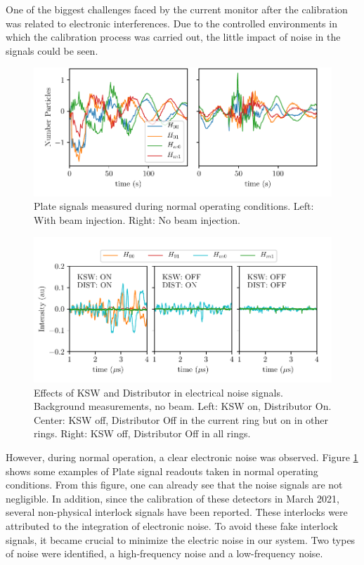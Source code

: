 One of the biggest challenges faced by the \hzhm current monitor after the calibration was related to electronic interferences. Due to the controlled environments in which the calibration process was carried out, the little impact of noise in the signals could be seen.

\begin{figure}[]
    \centering
    \includegraphics[width=1.0\columnwidth]{Figure_NoiseProblems/NoiseProblem.pdf}
    \caption{Plate signals measured during normal operating conditions. Left: With beam injection. Right: No beam injection. }
    \label{fig:Noise}
\end{figure}

\begin{figure}[thb]
    \centering
    \includegraphics[width=1.0\columnwidth]{Figure_KSWandDISTeffect/KswDistEffect.pdf}
    \caption{Effects of KSW and Distributor in electrical noise signals. Background measurements, no beam. Left: KSW on, Distributor On. Center: KSW off, Distributor Off in the current ring but on in other rings. Right: KSW off, Distributor Off in all rings. }
    \label{fig:KSWandDist}
\end{figure}

However, during normal operation, a clear electronic noise was observed. Figure \ref{fig:Noise} shows some examples of Plate signal readouts taken in normal operating conditions. From this figure, one can already see that the noise signals are not negligible. In addition, since the calibration of these detectors in March 2021, several non-physical interlock signals have been reported. These interlocks were attributed to the integration of electronic noise. To avoid these fake interlock signals, it became crucial to minimize the electric noise in our system. Two types of noise were identified, a high-frequency noise and a low-frequency noise. 

